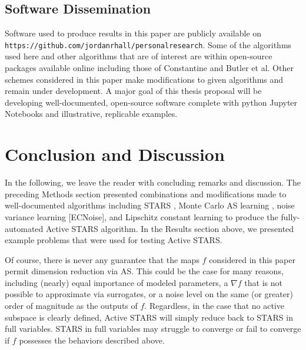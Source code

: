 \documentclass{amsart}
\begin{document}
\subsection{Software Dissemination}

Software used to produce results in this paper are publicly available on \texttt{https://github.com/jordanrhall/personalresearch}. Some of the algorithms used here and other algorithms that are of interest are within open-source packages available online including those of Constantine and Butler et al. Other schemes considered in this paper make modifications to given algorithms and remain under development. A major goal of this thesis proposal will be developing well-documented, open-source software complete with python Jupyter Notebooks and illustrative, replicable examples.


\section{Conclusion and Discussion}

In the following, we leave the reader with concluding remarks and discussion. The preceding Methods section presented combinations and modifications made to well-documented algorithms including STARS \cite{CW}, Monte Carlo AS learning \cite{ConstantineMC}, noise variance learning [ECNoise], and Lipschitz constant learning \cite{Calliess} to produce the fully-automated Active STARS algorithm. In the Results section above, we presented example problems that were used for testing Active STARS.

Of course, there is never any guarantee that the maps $f$ considered in this paper permit dimension reduction via AS. This could be the case for many reasons, including (nearly) equal importance of modeled parameters, a $\nabla f$ that is not possible to approximate via surrogates, or a noise level on the same (or greater) order of magnitude as the outputs of $f$. Regardless, in the case that no active subspace is clearly defined, Active STARS will simply reduce back to STARS in full variables. STARS in full variables may struggle to converge or fail to converge if $f$ possesses the behaviors described above.
\end{document}

